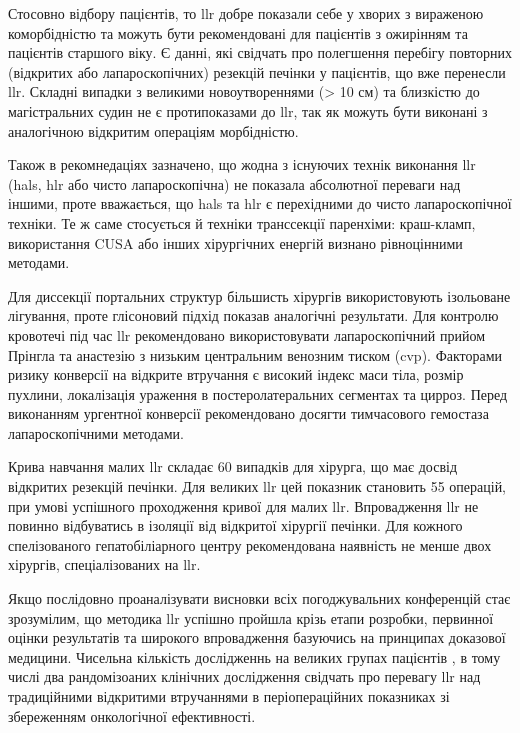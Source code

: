 \begin{refsection}
Стосовно відбору пацієнтів, то \acrshort{llr} добре показали себе у хворих з вираженою коморбідністю та можуть бути рекомендовані для пацієнтів з ожирінням та пацієнтів старшого віку. Є данні, які свідчать про полегшення перебігу повторних (відкритих або лапароскопічних) резекцій печінки у пацієнтів, що вже перенесли \acrshort{llr}. Складні випадки з великими новоутвореннями (> 10 см) та близкістю до магістральних судин не є протипоказами до \acrshort{llr}, так як можуть бути виконані з аналогічною відкритим операціям  морбідністю.

Також в рекомнедаціях зазначено, що жодна з існуючих технік виконання \acrshort{llr} (\acrshort{hals}, \acrshort{hlr} або чисто лапароскопічна) не показала абсолютної переваги над іншими, проте вважається, що \acrshort{hals} та \acrshort{hlr} є перехідними до чисто лапароскопічної техніки. Те ж саме стосується й техніки транссекції паренхіми: краш-кламп, використання CUSA або інших хірургічних енергій визнано рівноцінними методами. 
   
Для диссекції портальних структур більшисть хірургів використовують ізольоване лігування, проте глісоновий підхід показав аналогічні результати. Для контролю кровотечі під час \acrshort{llr} рекомендовано використовувати лапароскопічний прийом Прінгла та анастезію з низьким центральним венозним тиском (\acrshort{cvp}). Факторами ризику конверсії на відкрите втручання є високий індекс маси тіла, розмір пухлини, локалізація ураження в постеролатеральних сегментах та цирроз. Перед виконанням ургентної конверсії рекомендовано досягти тимчасового гемостаза лапароскопічними методами.

Крива навчання малих \acrshort{llr} складає 60 випадків для хірурга, що має досвід відкритих резекцій печінки. Для великих \acrshort{llr} цей показник становить 55 операцій, при умові успішного проходження кривої для малих \acrshort{llr}. Впровадження \acrshort{llr} не повинно відбуватись в ізоляції від відкритої хірургії печінки. Для кожного спелізованого гепатобіліарного центру рекомендована наявність не менше двох хірургів, спеціалізованих на \acrshort{llr}.

Якщо послідовно проаналізувати висновки всіх погоджувальних конференцій стає зрозумілим, що методика \acrshort{llr} успішно пройшла крізь етапи розробки, первинної оцінки результатів та широкого впровадження базуючись на принципах доказової медицини. Чисельна кількість дослідженнь на великих групах пацієнтів \cite{Ciria2016b, Takahara2016, Berardi2017}, в тому числі два рандомізоаних клінічних дослідження \cite{Fretland2018b, Robles-Campos2019} свідчать про перевагу \acrshort{llr} над традиційними відкритими втручаннями в періопераційних показниках зі збереженням онкологічної ефективності. 


\end{refsection}
